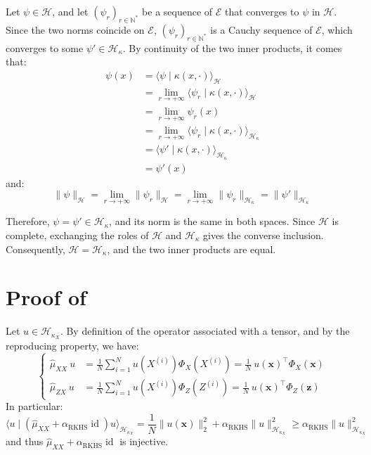 Let $\psi\in\mathcal{H}$, and let $(\psi_r)_{r\in\mathbb{N}^*}$ be a sequence of $\mathcal{E}$ that converges to $\psi$ in $\mathcal{H}$. Since the two norms coincide on $\mathcal{E}$, $(\psi_r)_{r\in\mathbb{N}^*}$ is a Cauchy sequence of $\mathcal{E}$, which converges to some $\psi'\in\mathcal{H}_\kappa$. By continuity of the two inner products, it comes that:
\begin{equation}
	\begin{aligned}
	\psi(x)&=\langle\psi\mid \kappa(x,\cdot)\rangle_{\mathcal{H}}\\
	&=\lim_{r\to+\infty}\langle\psi_r\mid \kappa(x,\cdot)\rangle_{\mathcal{H}}\\
	&=\lim_{r\to+\infty}\psi_r(x)\\
	&=\lim_{r\to+\infty}\langle\psi_r\mid \kappa(x,\cdot)\rangle_{\mathcal{H}_\kappa}\\
	&=\langle\psi'\mid \kappa(x,\cdot)\rangle_{\mathcal{H}_\kappa}\\
	&=\psi'(x)
	\end{aligned}
\end{equation}
and:
\begin{equation}
	\|\psi\|_{\mathcal{H}}=\lim_{r\to+\infty}\|\psi_r\|_{\mathcal{H}}=\lim_{r\to+\infty}\|\psi_r\|_{\mathcal{H}_\kappa}=\|\psi'\|_{\mathcal{H}_\kappa}
\end{equation}

Therefore, $\psi=\psi'\in\mathcal{H}_\kappa$, and its norm is the same in both spaces. Since $\mathcal{H}$ is complete, exchanging the roles of $\mathcal{H}$ and $\mathcal{H}_\kappa$ gives the converse inclusion. Consequently, $\mathcal{H}=\mathcal{H}_\kappa$, and the two inner products are equal.

\section[Proof of Proposition 3.29]{Proof of }\label{sec:proof_conditional_KME_MC}

Let $u\in\mathcal{H}_{\kappa_X}$. By definition of the operator associated with a tensor, and by the reproducing property, we have:
\begin{equation}
	\left\{\begin{aligned}
	\hat{\mu}_{XX}\:u&=\frac{1}{N}\sum_{i=1}^Nu\left(X^{(i)}\right)\Phi_X\left(X^{(i)}\right)=\frac{1}{N}\:u(\mathbf{x})^\top\Phi_X(\mathbf{x})\\
	\hat{\mu}_{ZX}\:u&=\frac{1}{N}\sum_{i=1}^Nu\left(X^{(i)}\right)\Phi_Z\left(Z^{(i)}\right)=\frac{1}{N}\:u(\mathbf{x})^\top\Phi_Z(\mathbf{z})
	\end{aligned}\right.
\end{equation}
In particular:
\begin{equation}
	\langle u\mid\left(\hat{\mu}_{XX}+\alpha_{\mathrm{RKHS}} \operatorname{id}\right)u\rangle_{\mathcal{H}_{\kappa_X}}=\frac{1}{N}\|u(\mathbf{x})\|_2^2+\alpha_{\mathrm{RKHS}}\|u\|_{\mathcal{H}_{\kappa_X}}^2\geq\alpha_{\mathrm{RKHS}}\|u\|_{\mathcal{H}_{\kappa_X}}^2
\end{equation}
and thus $\hat{\mu}_{XX}+\alpha_{\mathrm{RKHS}} \operatorname{id}$ is injective.

